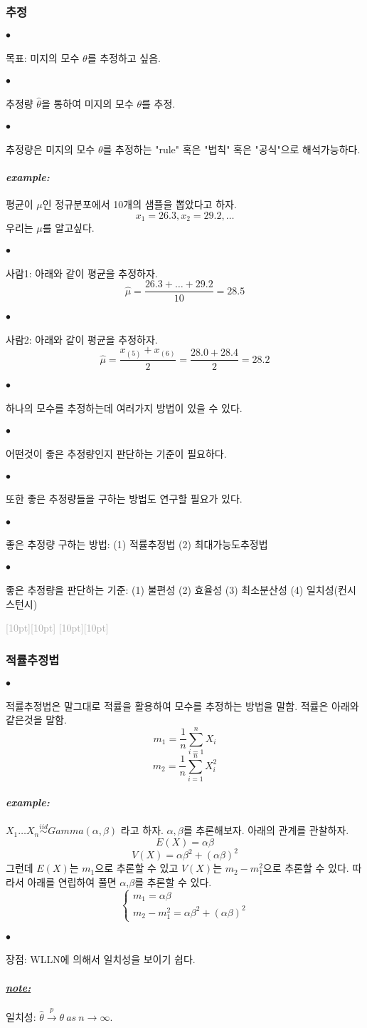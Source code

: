 \documentclass[12pt,oneside,english]{book}
\newcommand{\rdash}{\noindent \textcolor{darkgray}{ \raisebox{-1.9pt}[10pt][10pt]{\leafright} \hrulefill \raisebox{-1.9pt}[10pt][10pt]{\leafright \decofourleft \decothreeleft  \aldineright \decotwo \floweroneleft \decoone}}}
\def\ck{\paragraph{\Large$\bullet$}\Large}
\def\note{\paragraph{\Large\textit{\underline{note:}}}\Large}
\def\ex{\paragraph{\Large\textit{example:}}\Large}
\begin{document}
\subsubsection{추정}
\ck 목표: 미지의 모수 $\theta$를 추정하고 싶음. 
\ck 추정량 $\hat\theta$을 통하여 미지의 모수 $\theta$를 추정. 
\ck 추정량은 미지의 모수 $\theta$를 추정하는 "rule" 혹은 "법칙" 혹은 "공식"으로 해석가능하다. 

\ex 평균이 $\mu$인 정규분포에서 10개의 샘플을 뽑았다고 하자. 
\[
x_1=26.3, x_2=29.2, \dots 
\]
우리는 $\mu$를 알고싶다. 

\ck 사람1: 아래와 같이 평균을 추정하자. 
\[
\hat\mu= \frac{26.3+\dots+29.2}{10}=28.5
\]
\ck 사람2: 아래와 같이 평균을 추정하자. 
\[
\hat\mu= \frac{x_{(5)}+x_{(6)}}{2}=\frac{28.0+28.4}{2}=28.2
\]

\ck 하나의 모수를 추정하는데 여러가지 방법이 있을 수 있다. 

\ck 어떤것이 좋은 추정량인지 판단하는 기준이 필요하다. 

\ck 또한 좋은 추정량들을 구하는 방법도 연구할 필요가 있다. 

\ck 좋은 추정량 구하는 방법: (1) 적률추정법 (2) 최대가능도추정법 

\ck 좋은 추정량을 판단하는 기준: (1) 불편성 (2) 효율성 (3) 최소분산성 (4) 일치성(컨시스턴시) 

\rdash 

\subsubsection{적률추정법}

\ck 적률추정법은 말그대로 적률을 활용하여 모수를 추정하는 방법을 말함. 적률은 아래와 같은것을 말함.
\[
m_1=\frac{1}{n}\sum_{i=1}^{n}X_i
\]
\[
m_2=\frac{1}{n}\sum_{i=1}^{n}X_i^2
\]

\ex $X_1\dots X_n \overset{iid}{\sim} Gamma(\alpha,\beta)$ 라고 하자. $\alpha,\beta$를 추론해보자. 아래의 관계를 관찰하자. 
\[
E(X)=\alpha \beta
\]
\[
V(X)=\alpha \beta^2 + (\alpha\beta)^2 
\]
그런데 $E(X)$는 $m_1$으로 추론할 수 있고 $V(X)$는 $m_2-m_1^2$으로 추론할 수 있다. 따라서 아래를 연립하여 풀면 $\alpha$,$\beta$를 추론할 수 있다. 
\[
\begin{cases}
m_1=\alpha \beta \\
m_2-m_1^2=\alpha \beta^2 + (\alpha\beta)^2 
\end{cases}
\]

\ck 장점: WLLN에 의해서 일치성을 보이기 쉽다. 
\note 일치성: $\hat{\theta} \overset{p}{\to} \theta ~ as~  n \to \infty.$ 
\end{document}
